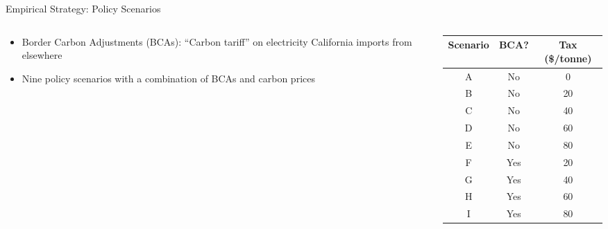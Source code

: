 \documentclass[11pt, aspectratio = 169]{beamer}
\begin{document}
\begin{frame}{Empirical Strategy: Policy Scenarios}
    
    \begin{columns}
        \begin{column}{0.5\textwidth}
            \begin{itemize}
                \item Border Carbon Adjustments (BCAs): ``Carbon tariff'' on electricity California imports from elsewhere
                \vspace*{1em}
                \item Nine policy scenarios with a combination of BCAs and carbon prices
            \end{itemize}
        \end{column}
        \begin{column}{0.5\textwidth}
            \footnotesize
            \centering
            \begin{tabular}{c c c}
                \hline\hline
                Scenario & BCA? & Tax (\$/tonne)\\
                \hline
                A & No & 0\\
                B & No & 20\\
                C & No & 40\\
                D & No & 60\\
                E & No & 80\\
                F & Yes & 20 \\
                G & Yes & 40 \\
                H & Yes & 60 \\
                I & Yes & 80 \\
            \hline    
            \end{tabular}
        \end{column}
    \end{columns}

\end{frame}
\end{document}

